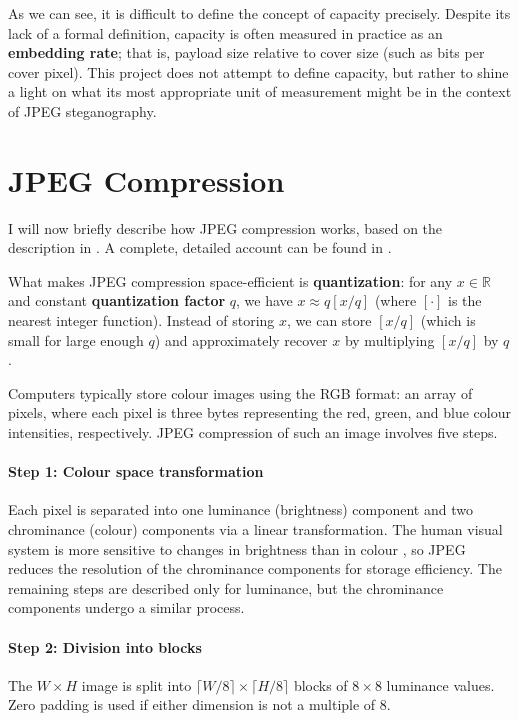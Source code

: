 \documentclass[11pt,a4paper,twoside,openright]{report}
\begin{document}
As we can see, it is difficult to define the concept of capacity precisely. Despite its lack of a formal definition, capacity is often measured in practice as an \textbf{embedding rate}; that is, payload size relative to cover size (such as bits per cover pixel). This project does not attempt to define capacity, but rather to shine a light on what its most appropriate unit of measurement might be in the context of JPEG steganography. 


\section{JPEG Compression} \label{sec:jpeg-compression}

I will now briefly describe how JPEG compression works, based on the description in \cite{ker-notes}. A complete, detailed account can be found in \cite{jpeg-standard}.

What makes JPEG compression space-efficient is \textbf{quantization}: for any $x \in \mathbb{R}$ and constant \textbf{quantization factor} $q$, we have $x \approx q [x/q]$ (where $[ \cdot ]$ is the nearest integer function). Instead of storing $x$, we can store $[x/q]$ (which is small for large enough $q$) and approximately recover $x$ by multiplying $[x/q]$ by $q$.

Computers typically store colour images using the RGB format: an array of pixels, where each pixel is three bytes representing the red, green, and blue colour intensities, respectively. JPEG compression of such an image involves five steps.

\paragraph{Step 1: Colour space transformation} Each pixel is separated into one luminance (brightness) component and two chrominance (colour) components via a linear transformation. The human visual system is more sensitive to changes in brightness than in colour \cite{textbook}, so JPEG reduces the resolution of the chrominance components for storage efficiency. The remaining steps are described only for luminance, but the chrominance components undergo a similar process.

\paragraph{Step 2: Division into blocks} The $W \times H$ image is split into $\lceil W/8 \rceil \times \lceil H/8 \rceil$ blocks of $8 \times 8$ luminance values. Zero padding is used if either dimension is not a multiple of 8.
\end{document}
